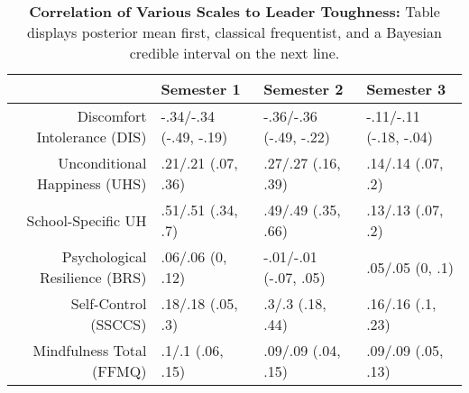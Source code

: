 \begin{table}[ht]
\centering
\begin{tabular}{rlll}
  \hline
 & Semester 1 & Semester 2 & Semester 3 \\ 
  \hline
Discomfort Intolerance (DIS) & -.34/-.34 (-.49, -.19) & -.36/-.36 (-.49, -.22) & -.11/-.11 (-.18, -.04) \\ 
  Unconditional Happiness (UHS) & .21/.21 (.07, .36) & .27/.27 (.16, .39) & .14/.14 (.07, .2) \\ 
  School-Specific UH & .51/.51 (.34, .7) & .49/.49 (.35, .66) & .13/.13 (.07, .2) \\ 
  Psychological Resilience (BRS) & .06/.06 (0, .12) & -.01/-.01 (-.07, .05) & .05/.05 (0, .1) \\ 
  Self-Control (SSCCS) & .18/.18 (.05, .3) & .3/.3 (.18, .44) & .16/.16 (.1, .23) \\ 
  Mindfulness Total (FFMQ) & .1/.1 (.06, .15) & .09/.09 (.04, .15) & .09/.09 (.05, .13) \\ 
   \hline
\end{tabular}
\caption{\textbf{Correlation of Various Scales to Leader Toughness:} Table displays posterior mean first, classical frequentist, and a Bayesian credible interval on the next line.} 
\label{tab:edc_corr}
\end{table}
